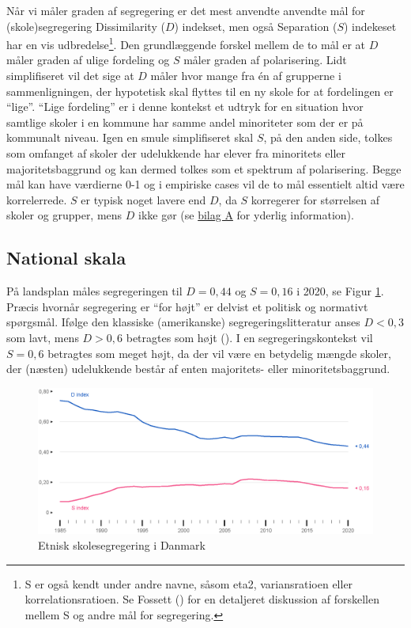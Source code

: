 \documentclass[
]{book}
\begin{document}
Når vi måler graden af segregering er det mest anvendte anvendte mål for (skole)segregering Dissimilarity (\(D\)) indekset, men også Separation (\(S\)) indekeset har en vis udbredelse\footnote{S er også kendt under andre navne, såsom eta2, variansratioen eller korrelationsratioen. Se Fossett () for en detaljeret diskussion af forskellen mellem S og andre mål for segregering.}. Den grundlæggende forskel mellem de to mål er at \(D\) måler graden af ulige fordeling og \(S\) måler graden af polarisering. Lidt simplifiseret vil det sige at \(D\) måler hvor mange fra én af grupperne i sammenligningen, der hypotetisk skal flyttes til en ny skole for at fordelingen er ``lige''. ``Lige fordeling'' er i denne kontekst et udtryk for en situation hvor samtlige skoler i en kommune har samme andel minoriteter som der er på kommunalt niveau. Igen en smule simplifiseret skal \(S\), på den anden side, tolkes som omfanget af skoler der udelukkende har elever fra minoritets eller majoritetsbaggrund og kan dermed tolkes som et spektrum af polarisering. Begge mål kan have værdierne 0-1 og i empiriske cases vil de to mål essentielt altid være korrelerrede. \(S\) er typisk noget lavere end \(D\), da \(S\) korregerer for størrelsen af skoler og grupper, mens \(D\) ikke gør (se \hyperref[bilag1]{bilag A} for yderlig information).

\subsection{National skala}\label{national-skala}

På landsplan måles segregeringen til \(D = 0,44\) og \(S = 0,16\) i 2020, se Figur \ref{fig:fig-3-2}. Præcis hvornår segregering er ``for højt'' er delvist et politisk og normativt spørgsmål. Ifølge den klassiske (amerikanske) segregeringslitteratur anses \(D < 0,3\) som lavt, mens \(D > 0,6\) betragtes som højt (). I en segregeringskontekst vil \(S=0,6\) betragtes som meget højt, da der vil være en betydelig mængde skoler, der (næsten) udelukkende består af enten majoritets- eller minoritetsbaggrund.

\begin{figure}
\includegraphics[width=1\linewidth]{images/figur_3_2} \caption{Etnisk skolesegregering i Danmark}\label{fig:fig-3-2}
\end{figure}
\end{document}
